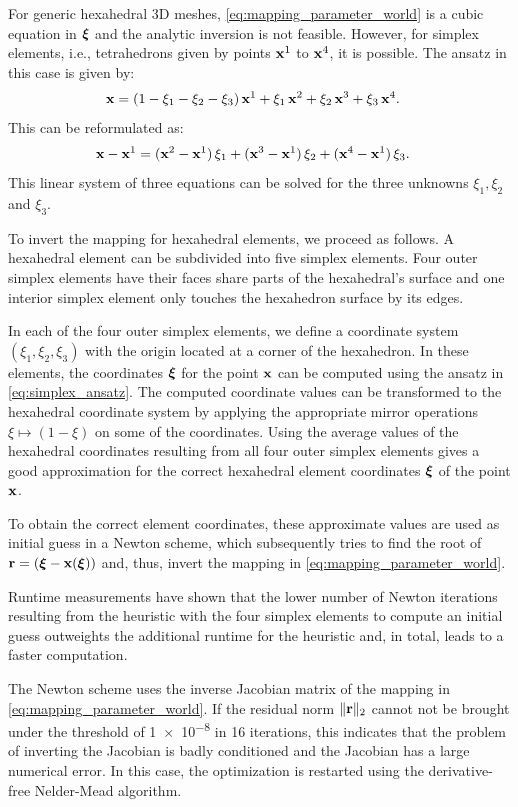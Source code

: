 For generic hexahedral 3D meshes, \cref{eq:mapping_parameter_world} is a cubic equation in $\boldsymbol{\xi}$ and the analytic inversion is not feasible. However, for simplex elements, i.e., tetrahedrons given by points $\textbf{x}^1$ to $\textbf{x}^4$, it is possible. The ansatz in this case is given by:
\begin{align*}
  \textbf{x} &= (1-\xi_1-\xi_2-\xi_3)\,\textbf{x}^1 + \xi_1\,\textbf{x}^2 + \xi_2\,\textbf{x}^3 + \xi_3\,\textbf{x}^4.
\end{align*}
This can be reformulated as:
\begin{align}\label{eq:simplex_ansatz}
   \textbf{x}-\textbf{x}^1 &= (\textbf{x}^2 - \textbf{x}^1)\,\xi_1 + (\textbf{x}^3  - \textbf{x}^1)\,\xi_2 + (\textbf{x}^4 - \textbf{x}^1)\,\xi_3.
\end{align}
This linear system of three equations can be solved for the three unknowns $\xi_1,\xi_2$ and $\xi_3$.

To invert the mapping for hexahedral elements, we proceed as follows.
A hexahedral element can be subdivided into five simplex elements. Four outer simplex elements have their faces share parts of the hexahedral's surface and one interior simplex element only touches the hexahedron surface by its edges. 

In each of the four outer simplex elements, we define a coordinate system $(\xi_1,\xi_2,\xi_3)$ with the origin located at a corner of the hexahedron. 
In these elements, the coordinates $\boldsymbol{\xi}$ for the point $\textbf{x}$ can be computed  using the ansatz in \cref{eq:simplex_ansatz}. The computed coordinate values can be transformed to the hexahedral coordinate system by applying the appropriate mirror operations $\xi \mapsto (1-\xi)$ on some of the coordinates. Using the average values of the hexahedral coordinates resulting from all four outer simplex elements gives a good approximation for the correct hexahedral element coordinates $\boldsymbol{\xi}$ of the point $\textbf{x}$.

To obtain the correct element coordinates, these approximate values are used as initial guess in a Newton scheme, which subsequently tries to find the root of $\textbf{r} = (\boldsymbol{\xi} - \textbf{x}(\boldsymbol{\xi}))$ and, thus, invert the mapping in \cref{eq:mapping_parameter_world}. 

Runtime measurements have shown that the lower number of Newton iterations resulting from the heuristic with the four simplex elements to compute an initial guess outweights the additional runtime for the heuristic and, in total, leads to a faster computation.

The Newton scheme uses the inverse Jacobian matrix of the mapping in \cref{eq:mapping_parameter_world}. If the residual norm $\Vert\textbf{r}\Vert_2$ cannot not be brought under the threshold of \num{1e-8} in 16 iterations, this indicates that the problem of inverting the Jacobian is badly conditioned and the Jacobian has a large numerical error. In this case, the optimization is restarted using the derivative-free Nelder-Mead algorithm.

